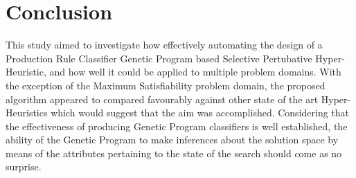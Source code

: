 \documentclass[a4paper,12pt]{article}
\begin{document}
\section{Conclusion} \label{sec:conclusion}
    \par{
        This study aimed to investigate how effectively automating the design of a Production Rule Classifier Genetic Program based Selective 
        Pertubative Hyper-Heuristic, and how well it could be applied to multiple problem domains.\newline 
        \newline 
        With the exception of the Maximum Satisfiability problem domain, the proposed algorithm appeared to compared favourably against other 
        state of the art Hyper-Heuristics which would suggest that the aim was accomplished. \newline 
        \newline 
        Considering that the effectiveness of producing Genetic Program classifiers is well established, the ability of the Genetic Program to 
        make inferences about the solution space by means of the attributes pertaining to the state of the search should come as no surprise. \newline 
        \newline  
    }
\newpage
% 

\end{document}
